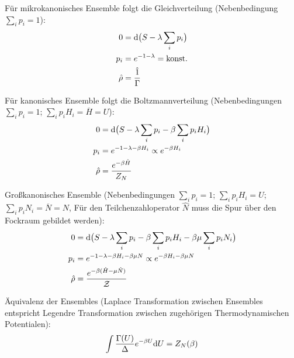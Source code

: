 \documentclass[11pt]{article}
\numberwithin{equation}{section}
\begin{document}
				\noindent
				Für mikrokanonisches Ensemble folgt die Gleichverteilung (Nebenbedingung $\sum_i p_i = 1$):
				\begin{equation}
					\begin{aligned}
						0 &= \diff \big( S - \lambda \sum_i p_i \big) \\
						p_i &= e^{-1-\lambda} = \konst \\
						\hat{\rho} &= \frac{\hat{1}}{\Gamma} \\ %
					\end{aligned}
				\end{equation}

				\noindent
				Für kanonisches Ensemble folgt die Boltzmannverteilung (Nebenbedingungen $\sum_i p_i = 1$; $\sum_i p_i H_i = \overline{H} = U$):
				\begin{equation}
					\begin{aligned}
						0 &= \mathrm{d} \big( S - \lambda \sum_i p_i - \beta \sum_i p_i H_i \big) \\
						p_i &= e^{-1-\lambda-\beta H_i} \propto e^{-\beta H_i} \\
						\hat{\rho} &= \frac{e^{-\beta \hat{H}}}{Z_N} \\
					\end{aligned}
				\end{equation}

				\noindent
				Großkanonisches Ensemble (Nebenbedingungen $\sum_i p_i = 1$; $\sum_i p_i H_i = U$; $\sum_i p_i N_i = \overline{N} = N$, Für den Teilchenzahloperator $\hat{N}$ muss die Spur über den Fockraum gebildet werden):
				\begin{equation}
					\begin{aligned}
						0 &= \mathrm{d} \big( S - \lambda \sum_i p_i - \beta \sum_i p_i H_i - \beta\mu \sum_i p_i N_i \big) \\
						p_i &= e^{-1-\lambda-\beta H_i-\beta\mu N} \propto e^{-\beta H_i - \beta\mu N} \\
						\hat{\rho} &= \frac{e^{-\beta (\hat{H} - \mu \hat{N})}}{\mathcal{Z}} \\
					\end{aligned}
				\end{equation}

				\noindent
				Äquivalenz der Ensembles (Laplace Transformation zwischen Ensembles entspricht Legendre Transformation zwischen zugehörigen Thermodynamischen Potentialen):
				\begin{equation}
					\int \frac{\Gamma(U)}{\Delta} e^{-\beta U} \mathrm{d} U = Z_N(\beta)
				\end{equation}
\end{document}
